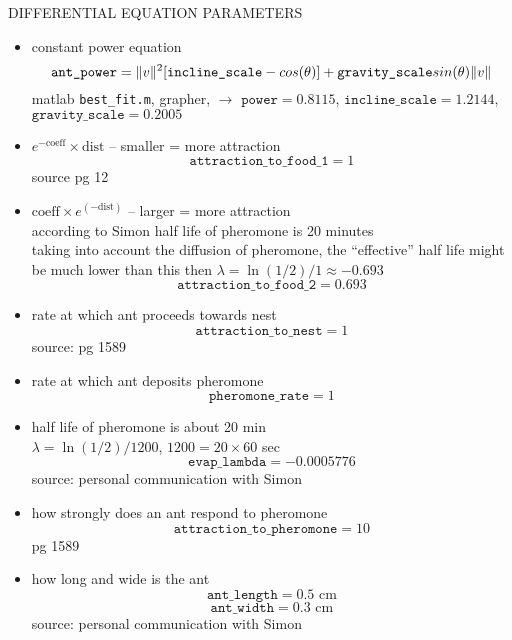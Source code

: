 \documentclass{article}
\theoremstyle{definition}
\DeclarePairedDelimiter\norm{\lVert}{\rVert}%
\begin{document}
DIFFERENTIAL EQUATION PARAMETERS
 \begin{itemize}
    
    \item constant power equation
    \[ \texttt{ant\_power} = \norm{v}^2[\texttt{incline\_scale} - cos(\theta)] + \texttt{gravity\_scale} sin(\theta) \norm{v}\]
    matlab \texttt{best\_fit.m}, grapher, \cite{holt_locomotion_2012} $\rightarrow$ $\texttt{power} = 0.8115$, $\texttt{incline\_scale} = 1.2144$, $\texttt{gravity\_scale} = 0.2005$


    \item $e^{-\text{coeff}} \times \text{dist}$ -- smaller = more attraction
    \[ \texttt{attraction\_to\_food\_1} = 1 \]
    source \cite{ryan_model_2016} pg 12

    \item $\text{coeff} \times e^{(-\text{dist})}$ -- larger = more attraction \\
    according to Simon half life of pheromone is 20 minutes \\
    taking into account the diffusion of pheromone, the ``effective'' half life might be much lower than this
    then $\lambda = \ln(1/2)/1 \approx -0.693$
    \[ \texttt{attraction\_to\_food\_2} = 0.693 \]

    \item rate at which ant proceeds towards nest
   	\[ \texttt{attraction\_to\_nest} = 1 \]
    source: \cite{ryan_model_2016} pg 1589

    \item rate at which ant deposits pheromone
    \[ \texttt{pheromone\_rate} = 1 \]

    \item half life of pheromone is about 20 min \\
    $\lambda = \ln(1/2)/1200$, $1200 = 20 \times 60$ sec
    \[ \texttt{evap\_lambda} = -0.0005776 \]
    source: personal communication with Simon
    

    \item how strongly does an ant respond to pheromone
    \[ \texttt{attraction\_to\_pheromone} = 10 \]
    \cite{ryan_model_2016} pg 1589

    \item how long and wide is the ant
    \[ \texttt{ant\_length} = 0.5 \text{ cm} \]
    \[ \texttt{ant\_width} = 0.3 \text{ cm} \]
    source: personal communication with Simon
\end{itemize}
\end{document}
